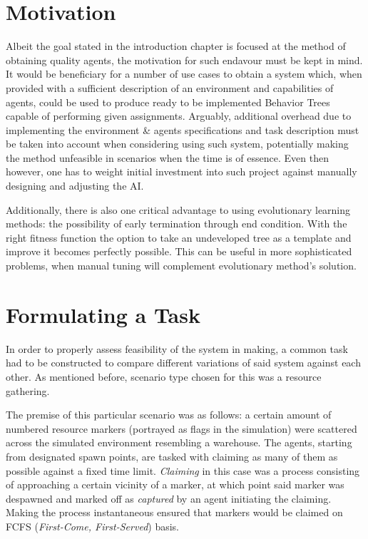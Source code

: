 \section{Motivation} %
Albeit the goal stated in the introduction chapter is focused at the method of obtaining quality agents, the motivation for such endavour must be kept in mind. It would be beneficiary for a number of use cases to obtain a system which, when provided with a sufficient description of an environment and capabilities of agents, could be used to produce ready to be implemented Behavior Trees capable of performing given assignments. Arguably, additional overhead due to implementing the environment \& agents specifications and task description must be taken into account when considering using such system, potentially making the method unfeasible in scenarios when the time is of essence. Even then however, one has to weight initial investment into such project against manually designing and adjusting the AI. %

Additionally, there is also one critical advantage to using evolutionary learning methods: the possibility of early termination through end condition. With the right fitness function the option to take an undeveloped tree as a template and improve it becomes perfectly possible. This can be useful in more sophisticated problems, when manual tuning will complement evolutionary method's solution. %
\section{Formulating a Task}
In order to properly assess feasibility of the system in making, a common task had to be constructed to compare different variations of said system against each other. As mentioned before, scenario type chosen for this was a resource gathering.

The premise of this particular scenario was as follows: a certain amount of numbered resource markers (portrayed as flags in the simulation) were scattered across the simulated environment resembling a warehouse. The agents, starting from designated spawn points, are tasked with claiming as many of them as possible against a fixed time limit. \textit{Claiming} in this case was a process consisting of approaching a certain vicinity of a marker, at which point said marker was despawned and marked off as \textit{captured} by an agent initiating the claiming. Making the process instantaneous ensured that markers would be claimed on FCFS (\textit{First-Come, First-Served}) basis.

